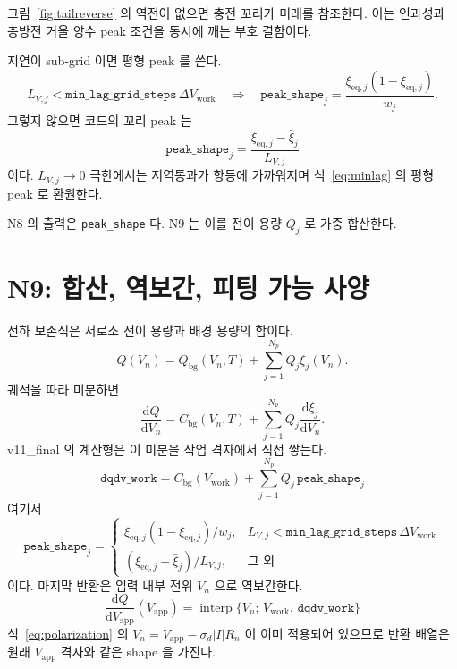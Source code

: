 \documentclass[11pt,a4paper]{article}
\newcommand{\dd}{\mathrm{d}}
\newcommand{\app}{\mathrm{app}}
\newcommand{\bg}{\mathrm{bg}}
\newcommand{\eq}{\mathrm{eq}}
\newcommand{\work}{\mathrm{work}}
\begin{document}
그림~\ref{fig:tailreverse} 의 역전이 없으면 충전 꼬리가 미래를 참조한다. 이는 인과성과 충방전 거울 양수 peak 조건을 동시에 깨는 부호 결함이다.

지연이 sub-grid 이면 평형 peak 를 쓴다.
\begin{equation}
L_{V,j}<\texttt{min\_lag\_grid\_steps}\,\Delta V_{\work}
\quad\Longrightarrow\quad
\texttt{peak\_shape}_j=\frac{\xi_{\eq,j}(1-\xi_{\eq,j})}{w_j}.
\label{eq:minlag}
\end{equation}
그렇지 않으면 코드의 꼬리 peak 는
\begin{equation}
\boxed{\;\texttt{peak\_shape}_j=\frac{\xi_{\eq,j}-\bar\xi_j}{L_{V,j}}\;}
\label{eq:tailshape}
\end{equation}
이다. $L_{V,j}\to0$ 극한에서는 저역통과가 항등에 가까워지며 식~\eqref{eq:minlag} 의 평형 peak 로 환원한다.

N8 의 출력은 \texttt{peak\_shape} 다. N9 는 이를 전이 용량 $Q_j$ 로 가중 합산한다.

\section{N9: 합산, 역보간, 피팅 가능 사양}\label{sec:n9}
전하 보존식은 서로소 전이 용량과 배경 용량의 합이다.
\begin{equation}
Q(V_n)=Q_\bg(V_n,T)+\sum_{j=1}^{N_p}Q_j\xi_j(V_n).
\label{eq:chargev7}
\end{equation}
궤적을 따라 미분하면
\begin{equation}
\frac{\dd Q}{\dd V_n}=C_\bg(V_n,T)+\sum_{j=1}^{N_p}Q_j\frac{\dd\xi_j}{\dd V_n}.
\label{eq:sumgeneric}
\end{equation}
v11\_final 의 계산형은 이 미분을 작업 격자에서 직접 쌓는다.
\begin{equation}
\boxed{\;\texttt{dqdv\_work}
=C_\bg(V_{\work})+\sum_{j=1}^{N_p}Q_j\,\texttt{peak\_shape}_j\;}
\label{eq:dqdvwork}
\end{equation}
여기서
\begin{equation}
\texttt{peak\_shape}_j=
\begin{cases}
\xi_{\eq,j}(1-\xi_{\eq,j})/w_j,&
L_{V,j}<\texttt{min\_lag\_grid\_steps}\,\Delta V_{\work}\\[3pt]
(\xi_{\eq,j}-\bar\xi_j)/L_{V,j},&\text{그 외}
\end{cases}
\label{eq:peakchoice}
\end{equation}
이다. 마지막 반환은 입력 내부 전위 $V_n$ 으로 역보간한다.
\begin{equation}
\boxed{\;\frac{\dd Q}{\dd V_\app}(V_\app)
=\operatorname{interp}\{V_n;\,V_{\work},\,\texttt{dqdv\_work}\}\;}
\label{eq:interp}
\end{equation}
식~\eqref{eq:polarization} 의 $V_n=V_\app-\sigma_d|I|R_n$ 이 이미 적용되어 있으므로 반환 배열은 원래 $V_\app$ 격자와 같은 shape 을 가진다.
\end{document}
